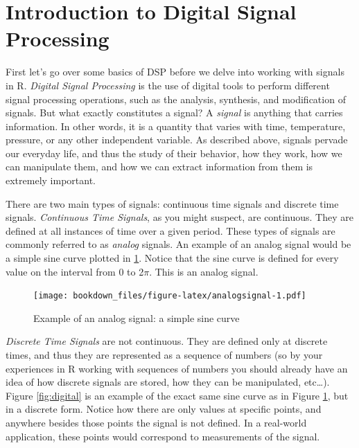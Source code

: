 \documentclass[
]{krantz}
\begin{document}
\hypertarget{introduction-to-digital-signal-processing}{%
\section{Introduction to Digital Signal Processing}\label{introduction-to-digital-signal-processing}}

First let's go over some basics of DSP before we delve into working with signals in R. \emph{Digital Signal Processing} is the use of digital tools to perform different signal processing operations, such as the analysis, synthesis, and modification of signals. But what exactly constitutes a signal? A \emph{signal} is anything that carries information. In other words, it is a quantity that varies with time, temperature, pressure, or any other independent variable. As described above, signals pervade our everyday life, and thus the study of their behavior, how they work, how we can manipulate them, and how we can extract information from them is extremely important.

There are two main types of signals: continuous time signals and discrete time signals. \emph{Continuous Time Signals}, as you might suspect, are continuous. They are defined at all instances of time over a given period. These types of signals are commonly referred to as \emph{analog} signals. An example of an analog signal would be a simple sine curve plotted in \ref{fig:analogsignal}. Notice that the sine curve is defined for every value on the interval from 0 to 2\(\pi\). This is an analog signal.

\begin{figure}
\centering
\texttt{[image: bookdown\_files/figure-latex/analogsignal-1.pdf]}
\caption{\label{fig:analogsignal}Example of an analog signal: a simple sine curve}
\end{figure}

\emph{Discrete Time Signals} are not continuous. They are defined only at discrete times, and thus they are represented as a sequence of numbers (so by your experiences in R working with sequences of numbers you should already have an idea of how discrete signals are stored, how they can be manipulated, etc\ldots). Figure \ref{fig:digital} is an example of the exact same sine curve as in Figure \ref{fig:analogsignal}, but in a discrete form. Notice how there are only values at specific points, and anywhere besides those points the signal is not defined. In a real-world application, these points would correspond to measurements of the signal.
\end{document}
